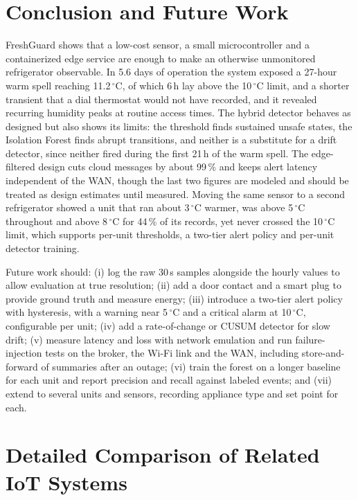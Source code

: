 \documentclass[conference]{IEEEtran}
\newcommand{\degC}{\ensuremath{^{\circ}}C}
\begin{document}
\section{Conclusion and Future Work}
FreshGuard shows that a low-cost sensor, a small microcontroller and a containerized edge service are enough to make an otherwise unmonitored refrigerator observable. In 5.6 days of operation the system exposed a 27-hour warm spell reaching 11.2\,\degC, of which 6\,h lay above the 10\,\degC{} limit, and a shorter transient that a dial thermostat would not have recorded, and it revealed recurring humidity peaks at routine access times. The hybrid detector behaves as designed but also shows its limits: the threshold finds sustained unsafe states, the Isolation Forest finds abrupt transitions, and neither is a substitute for a drift detector, since neither fired during the first 21\,h of the warm spell. The edge-filtered design cuts cloud messages by about 99\,\% and keeps alert latency independent of the WAN, though the last two figures are modeled and should be treated as design estimates until measured. Moving the same sensor to a second refrigerator showed a unit that ran about 3\,\degC{} warmer, was above 5\,\degC{} throughout and above 8\,\degC{} for 44\,\% of its records, yet never crossed the 10\,\degC{} limit, which supports per-unit thresholds, a two-tier alert policy and per-unit detector training.

Future work should: (i) log the raw 30\,s samples alongside the hourly values to allow evaluation at true resolution; (ii) add a door contact and a smart plug to provide ground truth and measure energy; (iii) introduce a two-tier alert policy with hysteresis, with a warning near 5\,\degC{} and a critical alarm at 10\,\degC, configurable per unit; (iv) add a rate-of-change or CUSUM detector for slow drift; (v) measure latency and loss with network emulation and run failure-injection tests on the broker, the Wi-Fi link and the WAN, including store-and-forward of summaries after an outage; (vi) train the forest on a longer baseline for each unit and report precision and recall against labeled events; and (vii) extend to several units and sensors, recording appliance type and set point for each.

\appendices
\section{Detailed Comparison of Related IoT Systems}
\end{document}
